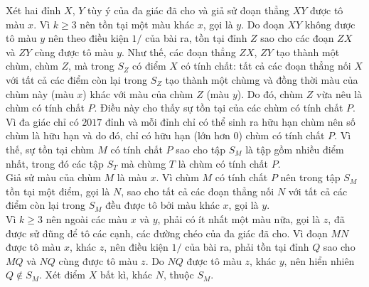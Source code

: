 \begin{bt}
{\begin{center}
		\end{center}
		Xét hai đỉnh $X$, $Y$ tùy ý của đa giác đã cho và giả sử đoạn thẳng $XY$ được tô màu $x$. Vì $k\ge 3$ nên tồn tại một màu khác $x$, gọi là $y$. Do đoạn $XY$ không được tô màu $y$ nên theo điều kiện $1/$ của bài ra, tồn tại đỉnh $Z$ sao cho các đoạn $ZX$ và $ZY$ cùng được tô màu $y$. Như thế, các đoạn thẳng $ZX$, $ZY$ tạo thành một chùm, chùm $Z$, mà trong $S_Z$ có điểm $X$ có tính chất: tất cả các đoạn thẳng nối $X$ với tất cả các điểm còn lại trong $S_Z$ tạo thành một chùmg và đồng thời màu của chùm này (màu $x$) khác với màu của chùm $Z$ (màu $y$). Do đó, chùm $Z$ vừa nêu là chùm có tính chất $P$. Điều này cho thấy sự tồn tại của các chùm có tính chất $P$.\\
		Vì đa giác chỉ có $2017$ đỉnh và mỗi đỉnh chỉ có thể sinh ra hữu hạn chùm nên số chùm là hữu hạn và do đó, chỉ có hữu hạn (lớn hơn $0$) chùm có tính chất $P$. Vì thế, sự tồn tại chùm $M$ có tính chất $P$ sao cho tập $S_M$ là tập gồm nhiều điểm nhất, trong đó các tập $S_T$ mà chùmg $T$ là chùm có tính chất $P$.\\
		Giả sử màu của chùm $M$ là màu $x$. Vì chùm $M$ có tính chất $P$ nên trong tập $S_M$ tồn tại một điểm, gọi là $N$, sao cho tất cả các đoạn thẳng nối $N$ với tất cả các điểm còn lại trong $S_M$ đều được tô bởi màu khác $x$, gọi là $y$.\\
		Vì $k\ge 3$ nên ngoài các màu $x$ và $y$, phải có ít nhất một màu nữa, gọi là $z$, đã được sử dũng để tô các cạnh, các đường chéo của đa giác đã cho. Vì đoạn $MN$ được tô màu $x$, khác $z$, nên điều kiện $1/$ của bài ra, phải tồn tại đỉnh $Q$ sao cho $MQ$ và $NQ$ cùng được tô màu $z$. Do $NQ$ được tô màu $z$, khác $y$, nên hiển nhiên $Q\notin S_M$. Xét điểm $X$ bất kì, khác $N$, thuộc $S_M$.\\
		\begin{center}
\end{center}}
\end{bt}
